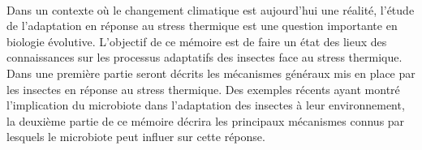 \paragraph{} %
\label{par:intro3}

Dans un contexte où le changement climatique est aujourd'hui une réalité, l'étude de l'adaptation en réponse au stress thermique est une question importante en biologie évolutive.
L'objectif de ce mémoire est de faire un état des lieux des connaissances sur les processus adaptatifs des insectes face au stress thermique.
Dans une première partie seront décrits les mécanismes généraux mis en place par les insectes en réponse au stress thermique.
Des exemples récents ayant montré l'implication du microbiote dans l'adaptation des insectes à leur environnement, la deuxième partie de ce mémoire décrira les principaux mécanismes connus par lesquels le microbiote peut inﬂuer sur cette réponse.


%


